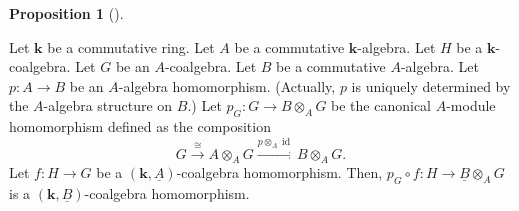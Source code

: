 \documentclass[numbers=enddot,12pt,final,onecolumn,notitlepage,abstracton]{scrartcl}%
\theoremstyle{definition}
\newtheorem{prop}[theo]{Proposition}
\newenvironment{proposition}[1][]
{\begin{prop}[#1]\begin{leftbar}}
{\end{leftbar}\end{prop}}
\begin{document}
\begin{proposition}
\label{prop.relative.composition.c1}Let $\mathbf{k}$ be a commutative ring.
Let $A$ be a commutative $\mathbf{k}$-algebra. Let $H$ be a $\mathbf{k}%
$-coalgebra. Let $G$ be an $A$-coalgebra. Let $B$ be a commutative
$A$-algebra. Let $p:A\rightarrow B$ be an $A$-algebra homomorphism. (Actually,
$p$ is uniquely determined by the $A$-algebra structure on $B$.) Let
$p_{G}:G\rightarrow B\otimes_{A}G$ be the canonical $A$-module homomorphism
defined as the composition%
\[
G\overset{\cong}{\longrightarrow}A\otimes_{A}G\overset{p\otimes_{A}%
\operatorname*{id}}{\longrightarrow}B\otimes_{A}G.
\]
Let $f:H\rightarrow G$ be a $\left(  \mathbf{k},\underline{A}\right)
$-coalgebra homomorphism. Then, $p_{G}\circ f:H\rightarrow\underline{B}%
\otimes_{A}G$ is a $\left(  \mathbf{k},\underline{B}\right)  $-coalgebra homomorphism.
\end{proposition}
\end{document}
